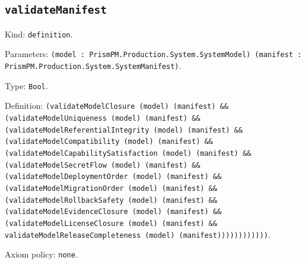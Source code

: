 \documentclass[11pt]{article}
\begin{document}
\subsection*{\texttt{validateManifest}}
\noindent Kind: \texttt{definition}.\par
\noindent Parameters: \texttt{(model : PrismPM.Production.System.SystemModel) (manifest : PrismPM.Production.System.SystemManifest)}.\par
\noindent Type: \texttt{Bool}.\par
\noindent Definition: \texttt{(validateModelClosure (model) (manifest) \&\& (validateModelUniqueness (model) (manifest) \&\& (validateModelReferentialIntegrity (model) (manifest) \&\& (validateModelCompatibility (model) (manifest) \&\& (validateModelCapabilitySatisfaction (model) (manifest) \&\& (validateModelSecretFlow (model) (manifest) \&\& (validateModelDeploymentOrder (model) (manifest) \&\& (validateModelMigrationOrder (model) (manifest) \&\& (validateModelRollbackSafety (model) (manifest) \&\& (validateModelEvidenceClosure (model) (manifest) \&\& (validateModelLicenseClosure (model) (manifest) \&\& validateModelReleaseCompleteness (model) (manifest))))))))))))}.\par
\noindent Axiom policy: \texttt{none}.\par
\end{document}

